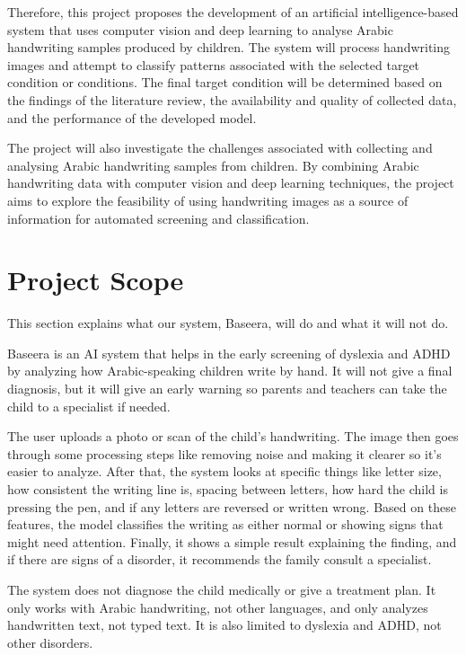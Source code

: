 Therefore, this project proposes the development of an artificial intelligence-based system that uses computer vision and deep learning to analyse Arabic handwriting samples produced by children. The system will process handwriting images and attempt to classify patterns associated with the selected target condition or conditions. The final target condition will be determined based on the findings of the literature review, the availability and quality of collected data, and the performance of the developed model.

The project will also investigate the challenges associated with collecting and analysing Arabic handwriting samples from children. By combining Arabic handwriting data with computer vision and deep learning techniques, the project aims to explore the feasibility of using handwriting images as a source of information for automated screening and classification.

\section{Project Scope}
\label{sec:scope}

This section explains what our system, Baseera, will do and what it will not do.

Baseera is an AI system that helps in the early screening of dyslexia and ADHD by analyzing how Arabic-speaking children write by hand. It will not give a final diagnosis, but it will give an early warning so parents and teachers can take the child to a specialist if needed.

The user uploads a photo or scan of the child's handwriting. The image then goes through some processing steps like removing noise and making it clearer so it's easier to analyze. After that, the system looks at specific things like letter size, how consistent the writing line is, spacing between letters, how hard the child is pressing the pen, and if any letters are reversed or written wrong. Based on these features, the model classifies the writing as either normal or showing signs that might need attention. Finally, it shows a simple result explaining the finding, and if there are signs of a disorder, it recommends the family consult a specialist.

The system does not diagnose the child medically or give a treatment plan. It only works with Arabic handwriting, not other languages, and only analyzes handwritten text, not typed text. It is also limited to dyslexia and ADHD, not other disorders.

